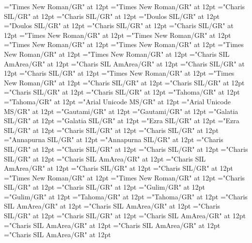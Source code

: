 \documentclass[a4paper]{article}
\begin{document}
\pagestyle{plain}
\sloppy
\setlength{\parfillskip}{0pt plus 1fil}
\font\divarIQ="Times New Roman/GR" at 12pt
\font\spanarIQ="Times New Roman/GR" at 12pt
\font\divbn="Charis SIL/GR" at 12pt
\font\spanbn="Charis SIL/GR" at 12pt
\font\divbzhfonipa="Doulos SIL/GR" at 12pt
\font\spanbzhfonipa="Doulos SIL/GR" at 12pt
\font\divbzh="Charis SIL/GR" at 12pt
\font\spanbzh="Charis SIL/GR" at 12pt
\font\divde="Times New Roman/GR" at 12pt
\font\spande="Times New Roman/GR" at 12pt
\font\divenfonipa="Times New Roman/GR" at 12pt
\font\spanenfonipa="Times New Roman/GR" at 12pt
\font\diven="Times New Roman/GR" at 12pt
\font\spanen="Times New Roman/GR" at 12pt
\font\divesaab="Charis SIL AmArea/GR" at 12pt
\font\spanesaab="Charis SIL AmArea/GR" at 12pt
\font\dives="Charis SIL/GR" at 12pt
\font\spanes="Charis SIL/GR" at 12pt
\font\divfa="Times New Roman/GR" at 12pt
\font\spanfa="Times New Roman/GR" at 12pt
\font\divfrZxxxxaudio="Charis SIL/GR" at 12pt
\font\spanfrZxxxxaudio="Charis SIL/GR" at 12pt
\font\divfr="Charis SIL/GR" at 12pt
\font\spanfr="Charis SIL/GR" at 12pt
\font\divggofonipaxemic="Tahoma/GR" at 12pt
\font\spanggofonipaxemic="Tahoma/GR" at 12pt
\font\divggoINxaheri="Arial Unicode MS/GR" at 12pt
\font\spanggoINxaheri="Arial Unicode MS/GR" at 12pt
\font\divggoTeluIN="Gautami/GR" at 12pt
\font\spanggoTeluIN="Gautami/GR" at 12pt
\font\divgrc="Galatia SIL/GR" at 12pt
\font\spangrc="Galatia SIL/GR" at 12pt
\font\divhbo="Ezra SIL/GR" at 12pt
\font\spanhbo="Ezra SIL/GR" at 12pt
\font\divhe="Charis SIL/GR" at 12pt
\font\spanhe="Charis SIL/GR" at 12pt
\font\divhi="Annapurna SIL/GR" at 12pt
\font\spanhi="Annapurna SIL/GR" at 12pt
\font\divhu="Charis SIL/GR" at 12pt
\font\spanhu="Charis SIL/GR" at 12pt
\font\divibafonipa="Charis SIL/GR" at 12pt
\font\spanibafonipa="Charis SIL/GR" at 12pt
\font\diviba="Charis SIL AmArea/GR" at 12pt
\font\spaniba="Charis SIL AmArea/GR" at 12pt
\font\dividZxxxxaudio="Charis SIL/GR" at 12pt
\font\spanidZxxxxaudio="Charis SIL/GR" at 12pt
\font\divid="Times New Roman/GR" at 12pt
\font\spanid="Times New Roman/GR" at 12pt
\font\divkm="Charis SIL/GR" at 12pt
\font\spankm="Charis SIL/GR" at 12pt
\font\divko="Gulim/GR" at 12pt
\font\spanko="Gulim/GR" at 12pt
\font\divlv="Tahoma/GR" at 12pt
\font\spanlv="Tahoma/GR" at 12pt
\font\divmiz="Charis SIL AmArea/GR" at 12pt
\font\spanmiz="Charis SIL AmArea/GR" at 12pt
\font\divms="Charis SIL/GR" at 12pt
\font\spanms="Charis SIL/GR" at 12pt
\font\divmxbfonipa="Charis SIL AmArea/GR" at 12pt
\font\spanmxbfonipa="Charis SIL AmArea/GR" at 12pt
\font\divmxb="Charis SIL AmArea/GR" at 12pt
\font\spanmxb="Charis SIL AmArea/GR" at 12pt
\end{document}
